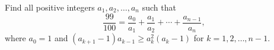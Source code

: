 Find all positive integers $a_1, a_2, \ldots, a_n$ such that
\[ \frac{99}{100} = \frac{a_0}{a_1} + \frac{a_1}{a_2} + \cdots + \frac{a_{n-1}}{a_n}, \]
where $a_0 = 1$ and $(a_{k+1} - 1)a_{k-1} \geq a_k^2(a_k - 1)$ for $k = 1, 2, \ldots, n - 1$.
